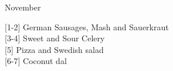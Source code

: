 		\begin{menu}{November}
    
    \begin{recipelist}
    
        {\scriptsize[1-2]} German Sausages, Mash and Sauerkraut\\
        {\scriptsize[3-4]} Sweet and Sour Celery\\
        {\scriptsize[5]} Pizza and Swedish salad\\
        {\scriptsize[6-7]} Coconut dal\\%
    \end{recipelist}%
    \begin{recipelist}
    
    \end{recipelist}\par%
  

\end{menu}
